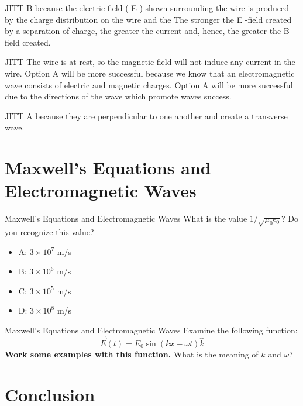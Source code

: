 \documentclass{beamer}
\begin{document}
\begin{frame}{JITT}
B because the electric field ( E ) shown surrounding the wire is produced by the charge distribution on the wire and the The stronger the E -field created by a separation of charge, the greater the current and, hence, the greater the B -field created.
\end{frame}

\begin{frame}{JITT}
The wire is at rest, so the magnetic field will not induce any current in the wire. Option A will be more successful because we know that an electromagnetic wave consists of electric and magnetic charges. Option A will be more successful due to the directions of the wave which promote waves success. 
\end{frame}

\begin{frame}{JITT}
A because they are perpendicular to one another and create a transverse wave.
\end{frame}

\section{Maxwell's Equations and Electromagnetic Waves}

\begin{frame}{Maxwell's Equations and Electromagnetic Waves}
What is the value $1/\sqrt{\mu_0 \epsilon_0}$?  Do you recognize this value?
\begin{itemize}
\item A: $3 \times 10^{7}$ m/s
\item B: $3 \times 10^{6}$ m/s
\item C: $3 \times 10^{5}$ m/s
\item D: $3 \times 10^{8}$ m/s
\end{itemize}
\end{frame}

\begin{frame}{Maxwell's Equations and Electromagnetic Waves}
Examine the following function:
\begin{equation}
\vec{E}(t) = E_0 \sin\left(k x - \omega t\right) \hat{k}
\end{equation}
\textbf{Work some examples with this function.}  What is the meaning of $k$ and $\omega$?
\end{frame}

\section{Conclusion}
\end{document}
